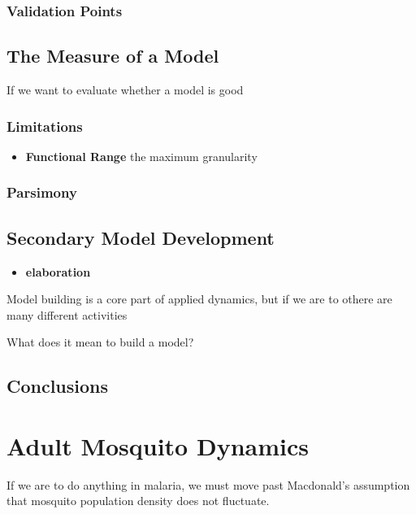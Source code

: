\documentclass[
]{book}
\providecommand{\tightlist}{%
  \setlength{\itemsep}{0pt}\setlength{\parskip}{0pt}}
\begin{document}
\subsection{Validation Points}\label{validation-points}

\section{The Measure of a Model}\label{the-measure-of-a-model}

If we want to evaluate whether a model is good

\subsection{Limitations}\label{limitations}

\begin{itemize}
\tightlist
\item
  \textbf{Functional Range} the maximum granularity
\end{itemize}

\subsection{Parsimony}\label{parsimony}

\section{Secondary Model Development}\label{secondary-model-development}

\begin{itemize}
\tightlist
\item
  \textbf{elaboration}
\end{itemize}

Model building is a core part of applied dynamics, but if we are to othere are many different activities

What does it mean to build a model?

\section{Conclusions}\label{conclusions}

\chapter{Adult Mosquito Dynamics}\label{adult-mosquito-dynamics}

If we are to do anything in malaria, we must move past Macdonald's assumption that mosquito population density does not fluctuate.
\end{document}
